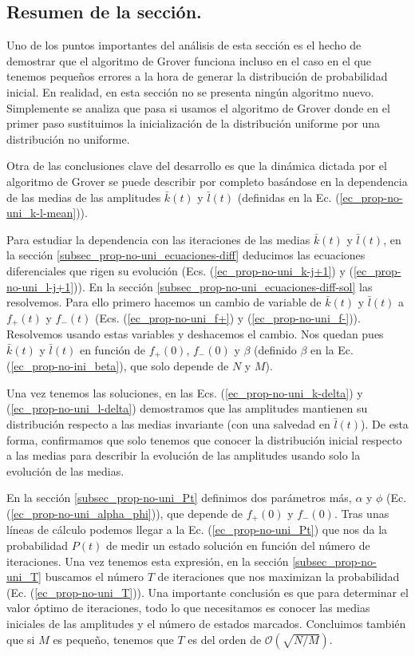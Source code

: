 \documentclass[a4paper,11pt]{article} %
\numberwithin{equation}{section}
\begin{document}
\subsection{Resumen de la sección.}  \label{sec_prop-no-uni_resumen}

Uno de los puntos importantes del análisis de esta sección es el hecho de demostrar que el algoritmo de Grover funciona incluso en el caso en el que tenemos pequeños errores a la hora de generar la distribución de probabilidad inicial. En realidad, en esta sección no se presenta ningún algoritmo nuevo. Simplemente se analiza que pasa si usamos el algoritmo de Grover donde en el primer paso sustituimos la inicialización de la distribución uniforme por una distribución no uniforme.

Otra de las conclusiones clave del desarrollo es que la dinámica dictada por el algoritmo de Grover se puede describir por completo basándose en la dependencia de las medias de las amplitudes $\bar{k}(t)$ y $\bar{l}(t)$ (definidas en la Ec. (\ref{ec_prop-no-uni_k-l-mean})).

Para estudiar la dependencia con las iteraciones de las medias $\bar{k}(t)$ y $\bar{l}(t)$, en la sección \ref{subsec_prop-no-uni_ecuaciones-diff} deducimos las ecuaciones diferenciales que rigen su evolución (Ecs. (\ref{ec_prop-no-uni_k-j+1}) y (\ref{ec_prop-no-uni_l-j+1})). En la sección \ref{subsec_prop-no-uni_ecuaciones-diff-sol} las resolvemos. Para ello primero hacemos un cambio de variable de $\bar{k}(t)$ y $\bar{l}(t)$ a $f_+(t)$ y $f_-(t)$ (Ecs. (\ref{ec_prop-no-uni_f+}) y (\ref{ec_prop-no-uni_f-})).  Resolvemos usando estas variables y deshacemos el cambio. Nos quedan pues $\bar{k}(t)$ y $\bar{l}(t)$ en función de $f_+(0)$, $f_-(0)$ y $\beta$ (definido $\beta$ en la Ec. (\ref{ec_prop-no-ini_beta}), que solo depende de $N$ y $M$). 

Una vez tenemos las soluciones, en las Ecs. (\ref{ec_prop-no-uni_k-delta}) y (\ref{ec_prop-no-uni_l-delta}) demostramos que las amplitudes mantienen su distribución respecto a las medias invariante (con una salvedad en $\bar{l}(t)$). De esta forma, confirmamos que solo tenemos que conocer la distribución inicial respecto a las medias para describir la evolución de las amplitudes usando solo la evolución de las medias. 

En la sección \ref{subsec_prop-no-uni_Pt}  definimos dos parámetros más, $\alpha$ y $\phi$ (Ec. (\ref{ec_prop-no-uni_alpha_phi})), que depende de $f_+(0)$ y $f_-(0)$. Tras unas líneas de cálculo podemos llegar a la Ec. (\ref{ec_prop-no-uni_Pt}) que nos da la probabilidad $P(t)$ de medir un estado solución en función del número de iteraciones. Una vez tenemos esta expresión, en la sección \ref{subsec_prop-no-uni_T} buscamos el número $T$ de iteraciones que nos maximizan la probabilidad (Ec. (\ref{ec_prop-no-uni_T})). Una importante conclusión es que para determinar el valor óptimo de iteraciones, todo lo que necesitamos es conocer las medias iniciales de las amplitudes y el número de estados marcados. Concluimos también que si $M$ es pequeño, tenemos que $T$ es del orden de $\mathcal{O}(\sqrt{N/M})$.
\end{document}

